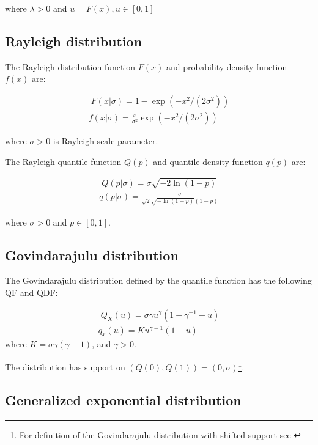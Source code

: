 \documentclass[
  12pt,
]{article}
\begin{document}
where \(\lambda>0\) and \(u=F(x), u \in [0,1]\)

\hypertarget{rayleigh-distribution}{%
\subsection*{Rayleigh distribution}\label{rayleigh-distribution}}

The Rayleigh distribution function \(F(x)\) and probability density function \(f(x)\) are:

\[ 
\begin{gathered}\;
F(x|\sigma) = 1-\exp(-x^2/(2\sigma^2)) \\ 
f(x|\sigma) = \frac{x}{\sigma^2}\exp(-x^2/(2\sigma^2))
\end{gathered}
\]

where \(\sigma>0\) is Rayleigh scale parameter.

The Rayleigh quantile function \(Q(p)\) and quantile density function \(q(p)\) are:

\[
\begin{gathered}\;
Q(p|\sigma)=\sigma\sqrt{-2\ln(1-p)} \\ 
q(p|\sigma)=\frac{\sigma}{\sqrt{2}\sqrt{-\ln(1-p)}(1-p)}
\end{gathered}
\]

where \(\sigma>0\) and \(p \in [0,1]\).

\hypertarget{govindarajulu-distribution}{%
\subsection*{Govindarajulu distribution}\label{govindarajulu-distribution}}

The Govindarajulu distribution defined by the quantile function has the following QF and QDF:

\[
\begin{gathered}\;
Q_X(u)=\sigma\gamma u^\gamma(1+\gamma^{-1}-u)\\
q_x(u)=Ku^{\gamma-1}(1-u)
\end{gathered}
\]
where \(K=\sigma\gamma(\gamma+1)\), and \(\gamma>0\).

The distribution has support on \((Q(0), Q(1))=(0, \sigma)\)\footnote{For definition of the Govindarajulu distribution with shifted support see \citet{nair2012GovindarajuluDistributionProperties}}.

\hypertarget{generalized-exponential-distribution}{%
\subsection*{Generalized exponential distribution}\label{generalized-exponential-distribution}}
\end{document}
